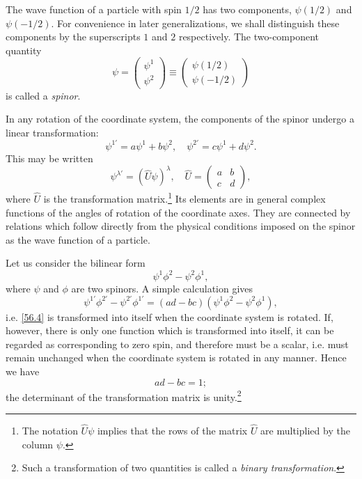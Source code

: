 The wave function of a particle with spin $ 1/2 $ has two components, $ \psi(1/2) $ and $ \psi(-1/2) $. For convenience in later generalizations, we shall distinguish these components by the superscripts $ 1 $ and $ 2 $ respectively. The two-component quantity
\begin{equation}\label{56.1}
\psi=\left(\begin{array}{c}
\psi^1\\\psi^2
\end{array} \right)\equiv\left(\begin{array}{c}
\psi\left(1/2\right)\\\psi\left(-1/2\right)
\end{array} \right)
\end{equation}
is called a \textit{spinor}.

In any rotation of the coordinate system, the components of the spinor undergo a linear transformation:
\begin{equation}\label{56.2}
\psi^{1'}=a\psi^1+b\psi^2,\quad\psi^{2'}=c\psi^1+d\psi^2.
\end{equation}
This may be written
\begin{equation}\label{56.3}
\psi^{\lambda'}=(\hat{U}\psi)^\lambda,\quad\hat{U}=\left(\begin{array}{cc}
a&b\\
c&d
\end{array}\right),
\end{equation}
where $\hat{U}$ is the transformation matrix.\footnote{The notation $ \hat{U}\psi $ implies that the rows of the matrix $\hat{U}$ are multiplied by the column $\psi$.} Its elements are in general complex functions of the angles of rotation of the coordinate axes. They are connected by relations which follow directly from the physical conditions imposed on the spinor as the wave function of a particle.

Let us consider the bilinear form
\begin{equation}\label{56.4}
\psi^1\phi^2-\psi^2\phi^1,
\end{equation}
where $\psi$ and $\phi$ are two spinors. A simple calculation gives
\[ \psi^{1'}\phi^{2'}-\psi^{2'}\phi^{1'}=(ad-bc)(\psi^1\phi^2-\psi^2\phi^1), \]
i.e. \eqref{56.4} is transformed into itself when the coordinate system is rotated. If, however, there is only one function which is transformed into itself, it can be regarded as corresponding to zero spin, and therefore must be a scalar, i.e. must remain unchanged when the coordinate system is rotated in any manner. Hence we have
\begin{equation}\label{56.5}
ad-bc=1;
\end{equation}
the determinant of the transformation matrix is unity.\footnote{Such a transformation of two quantities is called a \textit{binary transformation}.}

